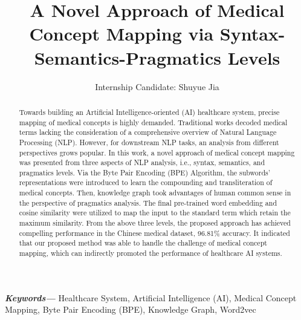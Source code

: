 \documentclass{article}
\title{A Novel Approach of Medical Concept Mapping via Syntax-Semantics-Pragmatics Levels}
\author{Internship Candidate: Shuyue Jia}
\providecommand{\keywords}[1]
{
	\small	
	\textbf{\textit{Keywords---}} #1
}
\begin{document}
\maketitle

\begin{abstract}
Towards building an Artificial Intelligence-oriented (AI) healthcare system, precise mapping of medical concepts is highly demanded. Traditional works decoded medical terms lacking the consideration of a comprehensive overview of Natural Language Processing (NLP). However, for downstream NLP tasks, an analysis from different perspectives grows popular. In this work, a novel approach of medical concept mapping was presented from three aspects of NLP analysis, i.e., syntax, semantics, and pragmatics levels. Via the Byte Pair Encoding (BPE) Algorithm, the subwords' representations were introduced to learn the compounding and transliteration of medical concepts. Then, knowledge graph took advantages of human common sense in the perspective of pragmatics analysis. The final pre-trained word embedding and cosine similarity were utilized to map the input to the standard term which retain the maximum similarity. From the above three levels, the proposed approach has achieved compelling performance in the Chinese medical dataset, 96.81\% accuracy. It indicated that our proposed method was able to handle the challenge of medical concept mapping, which can indirectly promoted the performance of healthcare AI systems.
\end{abstract}

\keywords{Healthcare System, Artificial Intelligence (AI), Medical Concept Mapping, Byte Pair Encoding (BPE), Knowledge Graph, Word2vec}
\end{document}

